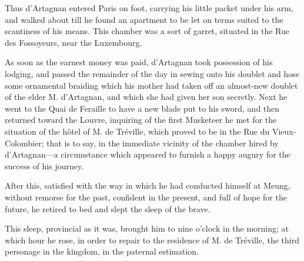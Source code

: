 Thus d'Artagnan entered Paris on foot, carrying his little packet under his arm, and walked about till he found an apartment to be let on terms suited to the scantiness of his means. This chamber was a sort of garret, situated in the Rue des Fossoyeurs, near the Luxembourg. 

As soon as the earnest money was paid, d'Artagnan took possession of his lodging, and passed the remainder of the day in sewing onto his doublet and hose some ornamental braiding which his mother had taken off an almost-new doublet of the elder M. d'Artagnan, and which she had given her son secretly. Next he went to the Quai de Feraille to have a new blade put to his sword, and then returned toward the Louvre, inquiring of the first Musketeer he met for the situation of the hôtel of M. de Tréville, which proved to be in the Rue du Vieux-Colombier; that is to say, in the immediate vicinity of the chamber hired by d'Artagnan---a circumstance which appeared to furnish a happy augury for the success of his journey. 

After this, satisfied with the way in which he had conducted himself at Meung, without remorse for the past, confident in the present, and full of hope for the future, he retired to bed and slept the sleep of the brave. 

This sleep, provincial as it was, brought him to nine o'clock in the morning; at which hour he rose, in order to repair to the residence of M. de Tréville, the third personage in the kingdom, in the paternal estimation.